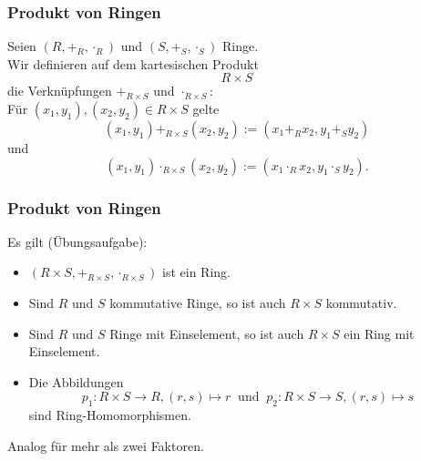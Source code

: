 %
\begin{frame}\frametitle{Produkt von Ringen}
	
	Seien $(R,+_R,\cdot_R)$ und $(S,+_S,\cdot_S)$ Ringe. \\
	Wir definieren auf dem kartesischen Produkt 
	$$
		R\times S
	$$ 
	die Verkn\"upfungen $+_{R\times S}$ und $\cdot_{R\times S}$: \\[1mm]
	F\"ur $(x_1,y_1), (x_2,y_2) \in R\times S$ gelte
	$$
		(x_1,y_1) +_{R\times S} (x_2,y_2) := (x_1 +_R x_2, y_1 +_S y_2)
	$$ 
	und
	$$
		(x_1,y_1) \cdot_{R\times S} (x_2,y_2) := (x_1 \cdot_R x_2, y_1 \cdot_S y_2).
	$$ 
		
\end{frame}
%
%
\begin{frame}\frametitle{Produkt von Ringen}
	
	Es gilt (\"Ubungsaufgabe):\\
	\begin{itemize}
		\item $(R\times S, +_{R\times S}, \cdot_{R\times S})$ ist ein Ring. \pause
		\item Sind $R$ und $S$ kommutative Ringe, so ist auch $R\times S$ kommutativ.
		\item Sind $R$ und $S$ Ringe mit Einselement, so ist auch $R\times S$ ein Ring mit Einselement. \pause
		\item Die Abbildungen
		$$p_1 : R\times S \to R, (r,s) \mapsto r \ \text{ und } \ p_2 : R\times S \to S, (r,s) \mapsto s$$
		sind Ring-Homomorphismen.
	\end{itemize}\vfill
	Analog für mehr als zwei Faktoren.
		
\end{frame}
%
